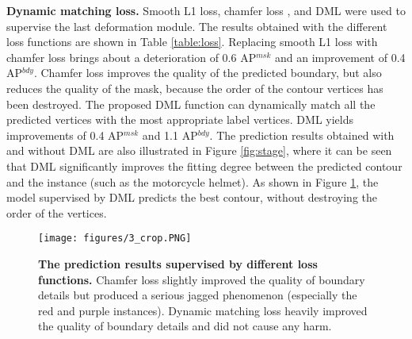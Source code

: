 \documentclass[10pt,twocolumn,letterpaper]{article}
\begin{document}
\textbf{Dynamic matching loss.} Smooth L1 loss, chamfer loss \cite{chamferloss}, and DML were used to supervise the last deformation module. The results obtained with the different loss functions are shown in Table \ref{table:loss}. Replacing smooth L1 loss with chamfer loss brings about a deterioration of 0.6 AP$^{msk}$ and an improvement of 0.4 AP$^{bdy}$. Chamfer loss improves the quality of the predicted boundary, but also reduces the quality of the mask, because the order of the contour vertices has been destroyed. The proposed DML function can dynamically match all the predicted vertices with the most appropriate label vertices. DML yields improvements of 0.4 AP$^{msk}$ and 1.1 AP$^{bdy}$. The prediction results obtained with and without DML are also illustrated in Figure \ref{fig:stage}, where it can be seen that DML significantly improves the fitting degree between the predicted contour and the instance (such as the motorcycle helmet). As shown in Figure \ref{fig:loss}, the model supervised by DML predicts the best contour, without destroying the order of the vertices. 
\begin{figure}[t]
  \centering
   \texttt{[image: figures/3\_crop.PNG]}\vspace{-2mm}
   \caption{\textbf{The prediction results supervised by different loss functions.} Chamfer loss slightly improved the quality of boundary details but produced a serious jagged phenomenon (especially the red and purple instances). Dynamic matching loss heavily improved the quality of boundary details and did not cause any harm.}\vspace{-6mm}
   \label{fig:loss}
\end{figure}
\end{document}
